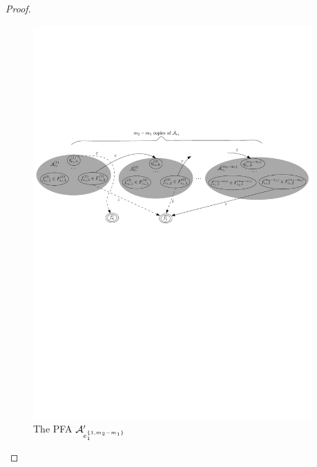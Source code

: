 \begin{proof}
\begin{itemize}
\begin{figure}[ht]
                \includegraphics[width = 0.95\textwidth]{reg2pfa-4.pdf}
                \caption{The PFA $\mathcal{A}^\prime_{e_1^{\{1,m_2-m_1\}}}$}
                \label{fig-reg2pfa-4}
            \end{figure}  


\end{itemize}
\end{proof}
